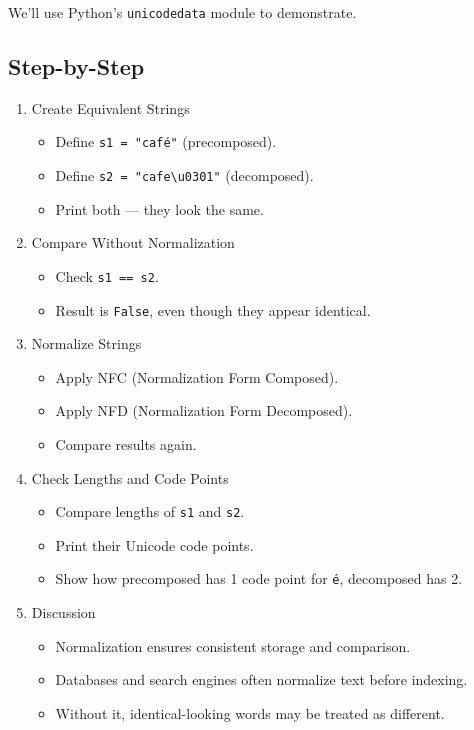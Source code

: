 \documentclass[
  letterpaper,
  DIV=11,
  numbers=noendperiod]{scrreprt}
\providecommand{\tightlist}{%
  \setlength{\itemsep}{0pt}\setlength{\parskip}{0pt}}
\begin{document}
We'll use Python's \texttt{unicodedata} module to demonstrate.

\subsection{Step-by-Step}\label{step-by-step-7}

\begin{enumerate}
\def\labelenumi{\arabic{enumi}.}
\item
  Create Equivalent Strings

  \begin{itemize}
  \tightlist
  \item
    Define \texttt{s1\ =\ "café"} (precomposed).
  \item
    Define \texttt{s2\ =\ "cafe\textbackslash{}u0301"} (decomposed).
  \item
    Print both --- they look the same.
  \end{itemize}
\item
  Compare Without Normalization

  \begin{itemize}
  \tightlist
  \item
    Check \texttt{s1\ ==\ s2}.
  \item
    Result is \texttt{False}, even though they appear identical.
  \end{itemize}
\item
  Normalize Strings

  \begin{itemize}
  \tightlist
  \item
    Apply NFC (Normalization Form Composed).
  \item
    Apply NFD (Normalization Form Decomposed).
  \item
    Compare results again.
  \end{itemize}
\item
  Check Lengths and Code Points

  \begin{itemize}
  \tightlist
  \item
    Compare lengths of \texttt{s1} and \texttt{s2}.
  \item
    Print their Unicode code points.
  \item
    Show how precomposed has 1 code point for \texttt{é}, decomposed has
    2.
  \end{itemize}
\item
  Discussion

  \begin{itemize}
  \tightlist
  \item
    Normalization ensures consistent storage and comparison.
  \item
    Databases and search engines often normalize text before indexing.
  \item
    Without it, identical-looking words may be treated as different.
  \end{itemize}
\end{enumerate}
\end{document}
